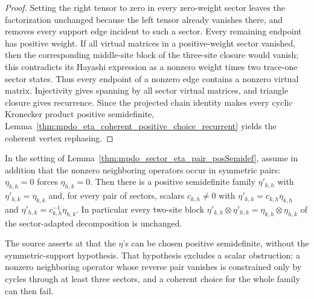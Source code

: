 \begin{proof}
    \leanok
    Setting the right tensor to zero in every zero-weight sector leaves the
    factorization unchanged because the left tensor already vanishes there,
    and removes every support edge incident to such a sector. Every remaining
    endpoint has positive weight. If all virtual matrices in a positive-weight
    sector vanished, then the corresponding middle-site block of the
    three-site closure would vanish; this contradicts its Hayashi expression
    as a nonzero weight times two trace-one sector states. Thus every endpoint
    of a nonzero edge contains a nonzero virtual matrix. Injectivity gives
    spanning by all sector virtual matrices, and triangle closure gives
    recurrence. Since the projected chain identity makes every cyclic Kronecker
    product positive semidefinite,
    Lemma~\ref{thm:mpdo_eta_coherent_positive_choice_recurrent} yields the
    coherent vertex rephasing.
\end{proof}

\begin{lemma}%
    \label{thm:mpdo_eta_positivity_choice_symmetric}
    \leanok
    In the setting of Lemma~\ref{thm:mpdo_sector_eta_pair_posSemidef},
    assume in addition that the nonzero neighboring operators occur in
    symmetric pairs: $\eta_{k,h}=0$ forces $\eta_{h,k}=0$. Then there is a
    positive semidefinite family $\eta'_{k,h}$ with $\eta'_{k,k}=\eta_{k,k}$
    and, for every pair of sectors, scalars $c_{k,h}\ne0$ with
    $\eta'_{k,h}=c_{k,h} \eta_{k,h}$ and
    $\eta'_{h,k}=c_{k,h}^{-1} \eta_{h,k}$. In particular every two-site
    block $\eta'_{k,h}\otimes\eta'_{h,k}=\eta_{k,h}\otimes\eta_{h,k}$ of
    the sector-adapted decomposition is unchanged.

    The source asserts at
    \cite[Appendix~C.2, lines~1446--1450]{Cirac2016MPDO_arXiv} that the
    $\eta$'s can be chosen positive semidefinite, without the
    symmetric-support hypothesis. That hypothesis excludes a scalar
    obstruction: a nonzero neighboring operator whose reverse pair
    vanishes is constrained only by cycles through at least three
    sectors, and a coherent choice for the whole family can then fail.
\end{lemma}

